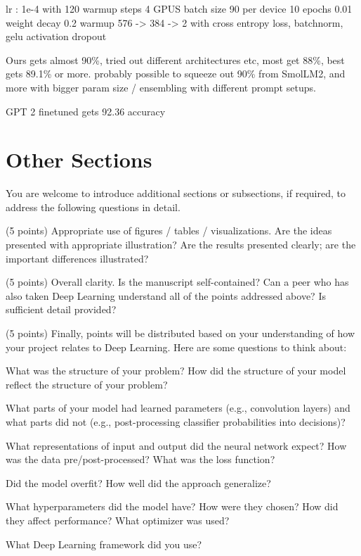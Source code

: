 \documentclass[10pt,twocolumn,letterpaper]{article}
\begin{document}
lr : 1e-4 with 120 warmup steps
4 GPUS batch size 90 per device
10 epochs
0.01 weight decay
0.2 warmup
576 -> 384 -> 2 with cross entropy loss, batchnorm, gelu activation
dropout

Ours gets almost 90\%, tried out different architectures etc, most get 88\%, best gets 89.1\% or more.
probably possible to squeeze out 90\% from SmolLM2, and more with bigger param size / ensembling with different prompt setups.

GPT 2 finetuned gets     92.36 accuracy

\section{Other Sections}





You are welcome to introduce additional sections or subsections, if required, to address the following questions in detail. 

(5 points) Appropriate use of figures / tables / visualizations. Are the ideas presented with appropriate illustration? Are the results presented clearly; are the important differences illustrated? 

(5 points) Overall clarity. Is the manuscript self-contained? Can a peer who has also taken Deep Learning understand all of the points addressed above? Is sufficient detail provided? 

(5 points) Finally, points will be distributed based on your understanding of how your project relates to Deep Learning. Here are some questions to think about: 

What was the structure of your problem? How did the structure of your model reflect the structure of your problem? 

What parts of your model had learned parameters (e.g., convolution layers) and what parts did not (e.g., post-processing classifier probabilities into decisions)? 

What representations of input and output did the neural network expect? How was the data pre/post-processed?
What was the loss function? 

Did the model overfit? How well did the approach generalize? 

What hyperparameters did the model have? How were they chosen? How did they affect performance? What optimizer was used? 

What Deep Learning framework did you use? 
\end{document}
